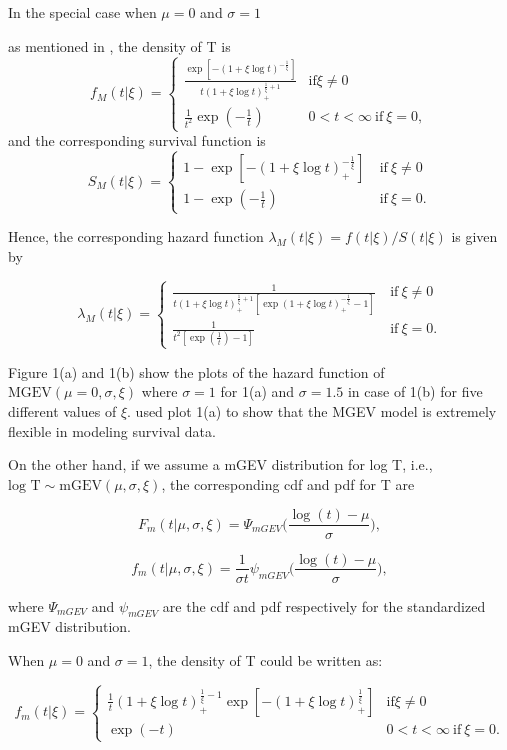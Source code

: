 \documentclass[smallextended]{svjour3}       %
\begin{document}
In the special case when $\mu=0$ and $\sigma=1$ {as mentioned in  \citet{roy:dey:2014}, the density of T is
\[
f_M(t|\xi)=\begin{cases}
\frac{\exp[-(1+\xi\log t)^{-\frac{1}{\xi}}]}{t(1+\xi\log t)_{+}^{\frac{1}{\xi}+1}} & \mbox{if} \xi\neq 0\\
\frac{1}{t^{2}}\exp(-\frac{1}{t}) & 0<t<\infty\ \mbox{if}\ \xi=0,
\end{cases}
\]
and the corresponding survival function is
\[
S_M(t|\xi)=\begin{cases}
1-\exp[-(1+\xi\log t)_+^{-\frac{1}{\xi}}]\  & \mbox{if}\ \xi\neq0\\
1-\exp(-\frac{1}{t}) & \mbox{if}\ \xi=0.
\end{cases}
\]

Hence, the corresponding hazard function $\lambda_M(t|\xi)=f(t|\xi)/S(t|\xi)$ is given by

\[
\lambda_M(t|\xi)=\begin{cases}
\frac{1}{t(1+\xi\log t)_+^{\frac{1}{\xi}+1}[\exp(1+\xi\log t)_+^{-\frac{1}{\xi}}-1]} & \ \mbox{if}\ \xi\neq0\\
\frac{1}{t^{2}[\exp(\frac{1}{t})-1]} & \ \mbox{if}\ \xi=0.
\end{cases}
\]


Figure 1(a) and 1(b) show the plots of the hazard function of $\mbox{MGEV}(\mu=0,\sigma,\xi)$ where $\sigma = 1$ for 1(a) and $\sigma = 1.5$ in case of 1(b) for five different values of $\xi$. \citet{roy:dey:2014} used plot 1(a) to show that the MGEV model is extremely flexible in modeling survival data. 


On the other hand, if we assume a mGEV distribution for log T, i.e.,  $\mbox{log T}\sim\mbox{mGEV}(\mu,\sigma,\xi)$, the corresponding cdf and pdf for T are

\[
F_m(t|\mu,\sigma,\xi)=\Psi_{mGEV}\bigg(\frac{\log(t)-\mu}{\sigma}\bigg),
\]


\[
f_m(t|\mu,\sigma,\xi)=\frac{1}{\sigma t}\psi_{mGEV}\bigg(\frac{\log(t)-\mu}{\sigma}\bigg),
\]

where $\Psi_{mGEV}$ and $\psi_{mGEV}$ are the cdf and pdf respectively for the standardized mGEV distribution.

When $\mu=0$ and $\sigma=1$, the density of T could be written as:

\[
f_m(t|\xi)=\begin{cases}
\frac{1}{t}(1+\xi\log t)_{+}^{\frac{1}{\xi}-1}\exp[-(1+\xi\log t)_{+}^{\frac{1}{\xi}}] & \mbox{if} \xi \neq 0\\
\exp(-t) & 0<t<\infty\ \mbox{if}\ \xi=0.
\end{cases}
\]

}
\end{document}
